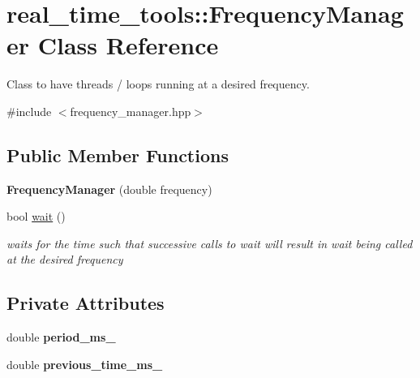 \hypertarget{classreal__time__tools_1_1FrequencyManager}{}\section{real\+\_\+time\+\_\+tools\+:\+:Frequency\+Manager Class Reference}
\label{classreal__time__tools_1_1FrequencyManager}


Class to have threads / loops running at a desired frequency.  




{\ttfamily \#include $<$frequency\+\_\+manager.\+hpp$>$}

\subsection*{Public Member Functions}
\begin{DoxyCompactItemize}
\item 
{\bfseries Frequency\+Manager} (double frequency)\hypertarget{classreal__time__tools_1_1FrequencyManager_a218f8a2651b453a89daa2968e2610032}{}\label{classreal__time__tools_1_1FrequencyManager_a218f8a2651b453a89daa2968e2610032}

\item 
bool \hyperlink{classreal__time__tools_1_1FrequencyManager_a3496f77c75f5ac8013b9f62345595e80}{wait} ()
\begin{DoxyCompactList}\small\item\em waits for the time such that successive calls to wait will result in wait being called at the desired frequency \end{DoxyCompactList}\end{DoxyCompactItemize}
\subsection*{Private Attributes}
\begin{DoxyCompactItemize}
\item 
double {\bfseries period\+\_\+ms\+\_\+}\hypertarget{classreal__time__tools_1_1FrequencyManager_ad32d927286a10fff1aefbb46d44748e1}{}\label{classreal__time__tools_1_1FrequencyManager_ad32d927286a10fff1aefbb46d44748e1}

\item 
double {\bfseries previous\+\_\+time\+\_\+ms\+\_\+}\hypertarget{classreal__time__tools_1_1FrequencyManager_a42fa6ff042ee8de87d85b8875bd2723f}{}\label{classreal__time__tools_1_1FrequencyManager_a42fa6ff042ee8de87d85b8875bd2723f}

\end{DoxyCompactItemize}


